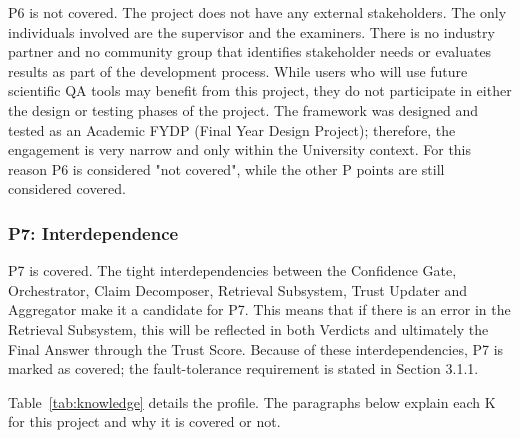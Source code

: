 P6 is not covered. The project does not have any external stakeholders. The only individuals involved are the supervisor and the examiners. There is no industry partner and no community group that identifies stakeholder needs or evaluates results as part of the development process. While users who will use future scientific QA tools may benefit from this project, they do not participate in either the design or testing phases of the project. The framework was designed and tested as an Academic FYDP (Final Year Design Project); therefore, the engagement is very narrow and only within the University context. For this reason P6 is considered "not covered", while the other P points are still considered covered.

\subsubsection{P7: Interdependence}

P7 is covered. The tight interdependencies between the Confidence Gate, Orchestrator, Claim Decomposer, Retrieval Subsystem, Trust Updater and Aggregator make it a candidate for P7. This means that if there is an error in the Retrieval Subsystem, this will be reflected in both Verdicts and ultimately the Final Answer through the Trust Score. Because of these interdependencies, P7 is marked as covered; the fault-tolerance requirement is stated in Section 3.1.1.

Table~\ref{tab:knowledge} details the profile. The paragraphs below explain
each K for this project and why it is covered or not.

